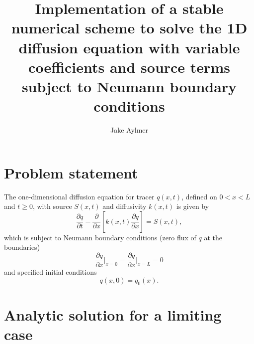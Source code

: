\documentclass[12pt]{article}
\begin{document}
\thispagestyle{empty}

\title{Implementation of a stable numerical scheme to solve the 1D diffusion equation with variable coefficients and source terms subject to Neumann boundary conditions}
\author{Jake Aylmer}
\maketitle

\section{Problem statement}

The one-dimensional diffusion equation for tracer $q(x,t)$, defined on $0<x<L$ and $t\geq 0$, with source $S(x,t)$ and diffusivity $k(x,t)$ is given by
\begin{equation}\label{eq:diffusionequation}
\frac{\partial q}{\partial t} - \frac{\partial}{\partial x}\left[k(x,t)\frac{\partial q}{\partial x}\right] = S(x,t),
\end{equation}
which is subject to Neumann boundary conditions (zero flux of $q$ at the boundaries)
\begin{equation}\label{eq:boundaryconditions}
\frac{\partial q}{\partial x}\Bigr|_{x=0} = \frac{\partial q}{\partial x}\Bigr|_{x=L}= 0
\end{equation}
and specified initial conditions
\begin{equation}\label{eq:initialconditions}
q(x,0) = q_0(x).
\end{equation}

\section{Analytic solution for a limiting case}
\end{document}
